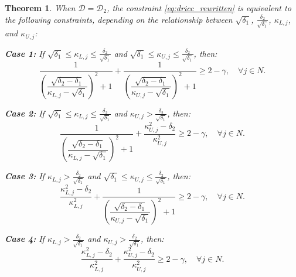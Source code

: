 \documentclass[preprint,12pt,authoryear]{elsarticle}
\newtheorem{theorem}{Theorem}
\begin{document}
\begin{theorem}\label{thm:dricc_d2_exact}
When $\mathcal{D} = \mathcal{D}_2$, the constraint \eqref{eq:dricc_rewritten} is equivalent to the following constraints, depending on the relationship between $\sqrt{\delta_1}$, $\frac{\delta_2}{\sqrt{\delta_1}}$, $\kappa_{L,j}$, and $\kappa_{U,j}$:

\textbf{Case 1:} If $\sqrt{\delta_1} \leqslant \kappa_{L,j} \leqslant \frac{\delta_2}{\sqrt{\delta_1}}$ and $\sqrt{\delta_1} \leqslant \kappa_{U,j} \leqslant \frac{\delta_2}{\sqrt{\delta_1}}$, then:
\begin{equation}
\dfrac{1}{\left( \dfrac{\sqrt{\delta_2 - \delta_1}}{\kappa_{L,j} - \sqrt{\delta_1}} \right)^{2} + 1} + \dfrac{1}{\left( \dfrac{\sqrt{\delta_2 - \delta_1}}{\kappa_{U,j} - \sqrt{\delta_1}} \right)^{2} + 1} \geqslant 2 - \gamma, \quad \forall j \in N. \label{eq:dricc_d2_exact_case1}
\end{equation}

\textbf{Case 2:} If $\sqrt{\delta_1} \leqslant \kappa_{L,j} \leqslant \frac{\delta_2}{\sqrt{\delta_1}}$ and $\kappa_{U,j} > \frac{\delta_2}{\sqrt{\delta_1}}$, then:
\begin{equation}
\dfrac{1}{\left( \dfrac{\sqrt{\delta_2 - \delta_1}}{\kappa_{L,j} - \sqrt{\delta_1}} \right)^{2} + 1} + \dfrac{\kappa_{U,j}^{2} - \delta_2}{\kappa_{U,j}^{2}} \geqslant 2 - \gamma, \quad \forall j \in N. \label{eq:dricc_d2_exact_case2}
\end{equation}

\textbf{Case 3:} If $\kappa_{L,j} > \frac{\delta_2}{\sqrt{\delta_1}}$ and $\sqrt{\delta_1} \leqslant \kappa_{U,j} \leqslant \frac{\delta_2}{\sqrt{\delta_1}}$, then:
\begin{equation}
\dfrac{\kappa_{L,j}^{2} - \delta_2}{\kappa_{L,j}^{2}} + \dfrac{1}{\left( \dfrac{\sqrt{\delta_2 - \delta_1}}{\kappa_{U,j} - \sqrt{\delta_1}} \right)^{2} + 1} \geqslant 2 - \gamma, \quad \forall j \in N. \label{eq:dricc_d2_exact_case3}
\end{equation}

\textbf{Case 4:} If $\kappa_{L,j} > \frac{\delta_2}{\sqrt{\delta_1}}$ and $\kappa_{U,j} > \frac{\delta_2}{\sqrt{\delta_1}}$, then:
\begin{equation}
\dfrac{\kappa_{L,j}^{2} - \delta_2}{\kappa_{L,j}^{2}} + \dfrac{\kappa_{U,j}^{2} - \delta_2}{\kappa_{U,j}^{2}} \geqslant 2 - \gamma, \quad \forall j \in N. \label{eq:dricc_d2_exact_case4}
\end{equation}
\end{theorem}
\end{document}
